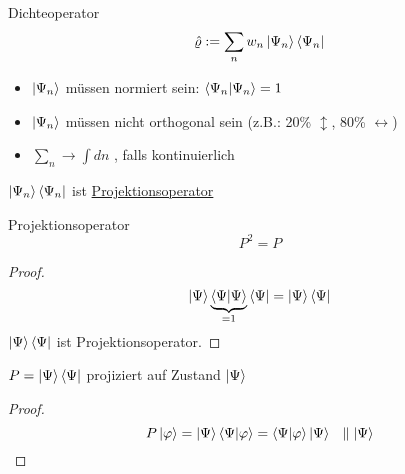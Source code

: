 \begin{definition}{Dichteoperator}
    \begin{equation}
        \hat{\varrho} := \sum_n w_n \ket{\Psi_n} \bra{\Psi_n}
    \end{equation}

    \begin{itemize}
        \item $\ket{\Psi_n}$ müssen normiert sein: $\bra{\Psi_n}\ket{\Psi_n} = 1$
        \item $\ket{\Psi_n}$ müssen nicht orthogonal sein (z.B.: 20\% $\updownarrow$, 80\% $\leftrightarrow$)
        \item $\sum_n \rightarrow \int dn$ , falls kontinuierlich
    \end{itemize}
\end{definition}

$\ket{\Psi_n}\bra{\Psi_n}$ ist \underline{Projektionsoperator}
\begin{definition}{Projektionsoperator}
\begin{equation}
    P^2 = P
\end{equation}
\end{definition}



\begin{proof}
\begin{equation}
    \ket{\Psi}\underbrace{\bra{\Psi}\ket{\Psi}}_{=1}\bra{\Psi} = \ket{\Psi}\bra{\Psi}
\end{equation}
$\ket{\Psi}\bra{\Psi}$ ist Projektionsoperator.

\end{proof}

$P = \ket{\Psi}\bra{\Psi}$ projiziert auf Zustand $\ket{\Psi}$

\begin{proof}
    \begin{equation}
        P \ket{\varphi} = \ket{\Psi} \bra{\Psi} \ket{\varphi} = \bra{\Psi}\ket{\varphi}\ket{\Psi} \ \  \parallel \ket{\Psi}
    \end{equation}
\end{proof}

